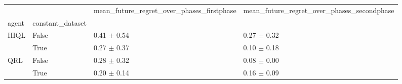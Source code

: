\begin{tabular}{llll}
\toprule
 &  & mean_future_regret_over_phases_firstphase & mean_future_regret_over_phases_secondphase \\
agent & constant_dataset &  &  \\
\midrule
\multirow[t]{2}{*}{HIQL} & False & 0.41 $\pm$ 0.54 & 0.27 $\pm$ 0.32 \\
 & True & 0.27 $\pm$ 0.37 & 0.10 $\pm$ 0.18 \\
\cline{1-4}
\multirow[t]{2}{*}{QRL} & False & 0.28 $\pm$ 0.32 & 0.08 $\pm$ 0.00 \\
 & True & 0.20 $\pm$ 0.14 & 0.16 $\pm$ 0.09 \\
\cline{1-4}
\bottomrule
\end{tabular}

